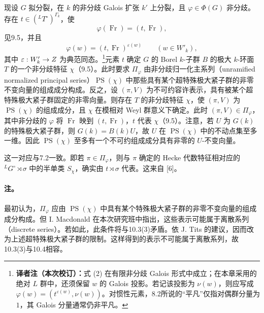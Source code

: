 现设 $G$ 拟分裂，在 $k$ 的非分歧 Galois 扩张 $k'$ 上分裂，且 $\varphi\in\Phi(G)$ 非分歧。存在 $t\in({}^LT^\circ)^{\Gamma_k}$，使
\begin{equation}
 \varphi(\operatorname{Fr})=(t,\operatorname{Fr}),\tag{1}
\end{equation}
见9.5，并且
\begin{equation}
 \varphi(w)=(t,\operatorname{Fr})^{\varepsilon(w)}\qquad(w\in W'_k),\tag{2}
\end{equation}
其中 $\varepsilon:W'_k\to Z$ 为典范同态。\footnote{\textbf{译者注（本次校订）：}式 (2) 在有限非分歧 Galois 形式中成立；在本章采用的绝对 $L$ 群中，还须保留 $w$ 的 Galois 投影。若记该投影为 $\nu(w)$，则应写成 $\varphi(w)=(t^{\varepsilon(w)},\nu(w))$。对惯性元素，8.2所说的“平凡”仅指对偶群分量为 $1$，其 Galois 分量通常仍非平凡。}元素 $t$ 确定 $G$ 的 Borel $k$-子群 $B$ 的极大 $k$-环面 $T$ 的一个非分歧特征 $\chi$（9.5）。此时要求 $\Pi_\varphi$ 由非分歧归一化主系列（unramified normalized principal series）$\operatorname{PS}(\chi)$ 中那些具有某个超特殊极大紧子群的非零不变向量的组成成分构成。反之，设 $(\pi,V)$ 为不可约容许表示，具有被某个超特殊极大紧子群固定的非零向量。则存在 $T$ 的非分歧特征 $\chi$，使 $(\pi,V)$ 为 $\operatorname{PS}(\chi)$ 的组成成分，且 $\chi$ 在模相对 Weyl 群意义下确定。此时 $(\pi,V)\in\Pi_\varphi$，其中非分歧的 $\varphi$ 将 $\operatorname{Fr}$ 映到 $(t,\operatorname{Fr})$，$t$ 代表 $\chi$（9.5）。注意，若 $U$ 为 $G(k)$ 的特殊极大紧子群，则 $G(k)=B(k)U$，故 $U$ 在 $\operatorname{PS}(\chi)$ 中的不动点集至多一维。因此 $\operatorname{PS}(\chi)$ 至多有一个不可约组成成分具有非零的 $U$-不变向量。

这一对应与7.2一致。即若 $\pi\in\Pi_\varphi$，则与 $\pi$ 确定的 Hecke 代数特征相对应的 ${}^LG^\circ\rtimes\sigma$ 中的半单类 $S_\chi$，确实由 $t\rtimes\sigma$ 代表。这来自 [6]。

\paragraph*{注。} 最初认为，$\Pi_\varphi$ 应由 $\operatorname{PS}(\chi)$ 中具有某个特殊极大紧子群的非零不变向量的组成成分构成。但 I. Macdonald 在本次研究班中指出，这些表示可能属于离散系列（discrete series）。若如此，此条件将与10.3(3)矛盾。依 J. Tits 的建议，因而改为上述超特殊极大紧子群的限制。这样得到的表示不可能属于离散系列，故10.3(3)与10.4相容。

